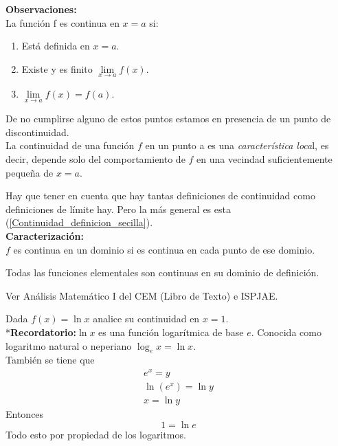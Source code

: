 \documentclass[10pt,twoside]{SelfArx} %
\begin{document}
\textbf{Observaciones:}\\
La función f es continua en $ x=a $ si:\\
\begin{enumerate}
	\item Está definida en $ x=a $.
	\item Existe y es finito $ \lim\limits_{x\rightarrow a}f(x) $.
	\item $ \lim\limits_{x\rightarrow a}f(x)=f(a) $.
\end{enumerate}
De no cumplirse alguno de estos puntos estamos en presencia de un punto de discontinuidad.\\
 La continuidad de una función $ f $ en un punto a es una \textsl{característica loca}l, es decir,
 depende solo del comportamiento de $ f $ en una vecindad suficientemente pequeña de $ x=a $.

Hay que tener en cuenta que hay tantas definiciones de continuidad como definiciones de límite hay. Pero la m\'as general es esta (\ref{Continuidad_definicion_secilla}).\\
\textbf{Caracterización:}\\
$ f $ es continua en un dominio si es continua en cada punto de ese dominio.\\
\begin{propiedad}
	Todas las funciones elementales son continuas en su dominio de definición.\\	
\end{propiedad}
Ver Análisis Matemático I del CEM (Libro de Texto) e ISPJAE.\\

\begin{ejemplo}
	Dada $ f(x)= \ln x $ analice su continuidad en $ x=1 $.\\
	*\textbf{Recordatorio:}$ \ln x $ es una función logarítmica de base $ e $. Conocida como logaritmo natural o neperiano $ \log_{e}x =\ln x$.\\
	También se tiene que\\
\begin{eqnarray}
e^{x}=y\\
\ln (e^{x})=\ln y\\
x=\ln y
\end{eqnarray}
Entonces \[ 1=\ln e \]
Todo esto por propiedad de los logaritmos.\\

\end{ejemplo}
\end{document}
